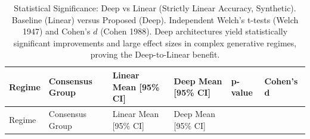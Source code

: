 \documentclass[
  letterpaper,
]{report}
\begin{document}
\begin{longtable}[]{@{}
  >{\raggedright\arraybackslash}p{}
  >{\raggedright\arraybackslash}p{}
  >{\raggedright\arraybackslash}p{}
  >{\raggedright\arraybackslash}p{}
  >{\raggedleft\arraybackslash}p{}
  >{\raggedleft\arraybackslash}p{}@{}}
\caption{Statistical Significance: Deep vs Linear (Strictly Linear
Accuracy, Synthetic). Baseline (Linear) versus Proposed (Deep).
Independent Welch's t-tests (Welch 1947) and Cohen's \(d\) (Cohen 1988).
Deep architectures yield statistically significant improvements and
large effect sizes in complex generative regimes, proving the
Deep-to-Linear benefit.}\label{tbl-stat-sig-synthetic}\tabularnewline
\toprule\noalign{}
\begin{minipage}[b]{\linewidth}\raggedright
Regime
\end{minipage} & \begin{minipage}[b]{\linewidth}\raggedright
Consensus Group
\end{minipage} & \begin{minipage}[b]{\linewidth}\raggedright
Linear Mean {[}95\% CI{]}
\end{minipage} & \begin{minipage}[b]{\linewidth}\raggedright
Deep Mean {[}95\% CI{]}
\end{minipage} & \begin{minipage}[b]{\linewidth}\raggedleft
p-value
\end{minipage} & \begin{minipage}[b]{\linewidth}\raggedleft
Cohen's d
\end{minipage} \\
\midrule\noalign{}
\endfirsthead
\toprule\noalign{}
\begin{minipage}[b]{\linewidth}\raggedright
Regime
\end{minipage} & \begin{minipage}[b]{\linewidth}\raggedright
Consensus Group
\end{minipage} & \begin{minipage}[b]{\linewidth}\raggedright
Linear Mean {[}95\% CI{]}
\end{minipage} & \begin{minipage}[b]{\linewidth}\raggedright
Deep Mean {[}95\% CI{]}
\end{minipage} & \begin{minipage}[b]{\linewidth}\raggedleft

\end{minipage}
\end{longtable}
\end{document}
